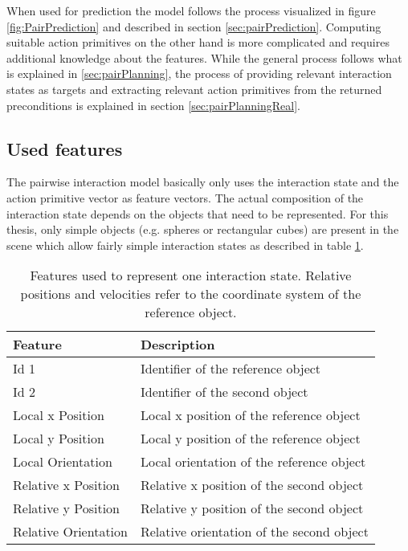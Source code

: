 When used for prediction the model follows the process visualized in figure \ref{fig:PairPrediction} and described in section \ref{sec:pairPrediction}.
Computing suitable action primitives on the other hand is more complicated and requires additional knowledge about the features. While the general process follows what is explained in \ref{sec:pairPlanning}, the process of providing relevant interaction states as targets and extracting relevant action primitives from the returned preconditions is explained in section \ref{sec:pairPlanningReal}.



\subsection{Used features \label{sec:intFeatures}}

The pairwise interaction model basically only uses the interaction state and the action primitive vector as feature vectors. The actual composition of the interaction state depends on the objects that need to be represented. For this thesis, only simple objects (e.g. spheres or rectangular cubes) are present in the scene which allow fairly simple interaction states as described in table \ref{tab:pairInteractionFeatures}.

\begin{table}
	\centering
	\begin{tabular*}{\textwidth}{@{\extracolsep{\fill} } l l}
		\textbf{Feature} & \textbf{Description} \\ 
		\hline \hline 
		 Id 1 & Identifier of the reference object \\ 
		 Id 2 & Identifier of the second object \\ 
		 Local x Position & Local x position of the reference object \\
		 Local y Position & Local y position of the reference object \\
		 Local Orientation & Local orientation of the reference object \\
		 Relative x Position & Relative x position of the second object \\
		 Relative y Position & Relative y position of the second object \\
		 Relative Orientation & Relative orientation of the second object \\
		\hline 
	\end{tabular*} 
	\caption{Features used to represent one interaction state. Relative positions and velocities refer to the coordinate system of the reference object.}
	\label{tab:pairInteractionFeatures}
\end{table}

